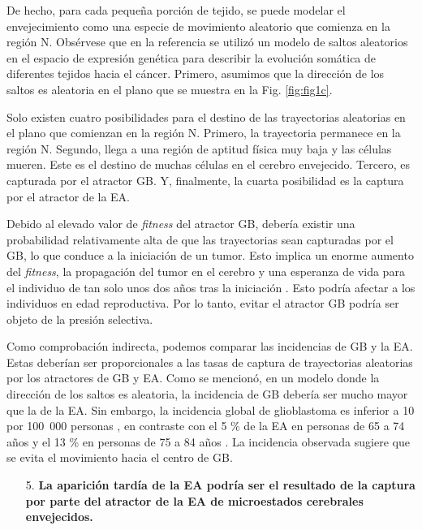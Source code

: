 De hecho, para cada pequeña porción de tejido, se puede modelar el envejecimiento como una especie de movimiento aleatorio que comienza en la región N. Obsérvese que en la referencia \cite{Herrero_2022} se utilizó un modelo de saltos aleatorios en el espacio de expresión genética para describir la evolución somática de diferentes tejidos hacia el cáncer. Primero, asumimos que la dirección de los saltos es aleatoria en el plano que se muestra en la Fig. \ref{fig:fig1c}.

Solo existen cuatro posibilidades para el destino de las trayectorias aleatorias en el plano que comienzan en la región N. Primero, la trayectoria permanece en la región N. Segundo, llega a una región de aptitud física muy baja y las células mueren. Este es el destino de muchas células en el cerebro envejecido. Tercero, es capturada por el atractor GB. Y, finalmente, la cuarta posibilidad es la captura por el atractor de la EA.

Debido al elevado valor de \textit{fitness} del atractor GB, debería existir una probabilidad relativamente alta de que las trayectorias sean capturadas por el GB, lo que conduce a la iniciación de un tumor. Esto implica un enorme aumento del \textit{fitness}, la propagación del tumor en el cerebro y una esperanza de vida para el individuo de tan solo unos dos años tras la iniciación \cite{Poon_2020}. Esto podría afectar a los individuos en edad reproductiva. Por lo tanto, evitar el atractor GB podría ser objeto de la presión selectiva.

Como comprobación indirecta, podemos comparar las incidencias de GB y la EA. Estas deberían ser proporcionales a las tasas de captura de trayectorias aleatorias por los atractores de GB y EA. Como se mencionó, en un modelo donde la dirección de los saltos es aleatoria, la incidencia de GB debería ser mucho mayor que la de la EA. Sin embargo, la incidencia global de glioblastoma es inferior a 10 por 100 000 personas \cite{Ohgaki2005}, en contraste con el 5 \% de la EA en personas de 65 a 74 años y el 13 \% en personas de 75 a 84 años \cite{alz2023}. La incidencia observada sugiere que se evita el movimiento hacia el centro de GB.

\begin{enumerate}
	\item[5.] \textbf{La aparición tardía de la EA podría ser el resultado de la captura por parte del atractor de la EA de microestados cerebrales envejecidos.}
\end{enumerate}

